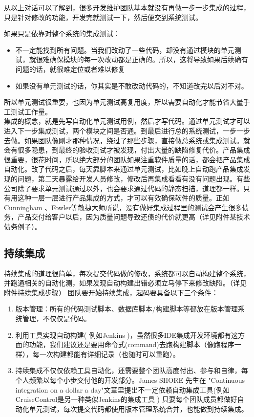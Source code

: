 从以上对话可以了解到，很多开发维护团队基本就没有再做一步一步集成的过程，只是针对修改的功能，开发完就测试一下，然后便交到系统测试。

如果只是依靠对整个系统的集成测试：

\begin{itemize}
\tightlist
\item
  不一定能找到所有问题。当我们改动了一些代码，却没有通过模块的单元测试，就很难确保模块的每一次改动都是正确的。所以，这将导致如果后续确有问题的话，就很难定位或者难以修复
\item
  如果没有单元测试的话，你其实是不敢改动代码的，不知道改完以后对不对。
\end{itemize}

所以单元测试很重要，也因为单元测试高复用度，所以需要自动化才能节省大量手工测试工作量。\\
集成的概念，就是先写自动化单元测试用例，然后才写代码。通过单元测试才可以进入下一步集成测试，两个模块之间是否通。到最后进行总的系统测试，一步一步去做。如果团队像刚才那种情况，绕过了那些步骤，直接做总系统或集成测试。就会有很多隐患，到最终的验收测试才被发现，付出大量的缺陷修复代价。产品集成很重要，很花时间，所以绝大部分的团队如果注重软件质量的话，都会把产品集成自动化。改了代码之后，每天靠脚本来通过单元测试，比如晚上自动跑产品集成发现的问题，第二天暴露给开发人员修改，修改后再集成看看有没有问题出现。有些公司除了要求单元测试通过以外，也会要求通过代码的静态扫描，道理都一样。只有用这种一层一层进行产品集成的方式，才可以有效确保软件的质量。正如Cunningham
、Fowler等敏捷大师所说，没有做好集成过程里的测试会产生很多债务，产品交付给客户以后，因为质量问题导致还债的代价就更高（详见附件某技术债务例子）。

\hypertarget{ux6301ux7eedux96c6ux6210}{%
\subsection{持续集成}\label{ux6301ux7eedux96c6ux6210}}

持续集成的道理很简单，每次提交代码做的修改，系统都可以自动构建整个系统，并跑通相关的自动化测，如果发现自动构建出错必须立马停下来修改缺陷。（详见附件持续集成步骤）
团队要开始持续集成，起码要具备以下三个条件：

\begin{enumerate}
\tightlist
\item
  版本管理：所有的代码测试脚本、数据库脚本/构建脚本等都放在版本管理系统管理，不仅仅是代码。
\item
  利用工具实现自动构建( 例如Jenkins
  )，虽然很多IDE集成开发环境都有这方面的功能，我们建议还是要用命令式(command)去跑构建脚本（像跑程序一样），每一次构建都能有详细记录（也随时可以重跑）。
\item
  持续集成不仅仅依赖工具自动化，还需要整个团队高度付出、参与和自律，每个人频繁以每个小步交付他的开发部分。James
  SHORE 先生在 "Continuous integration on a dollar a
  day"文章里提出不一定依赖自动集成工具(例如CruiseControl是另一种类似Jenkins的集成工具
  )
  只要每个团队成员都做好自动化单元测试，每次提交代码都使用版本管理系统合并，也能做到持续集成。
\end{enumerate}


